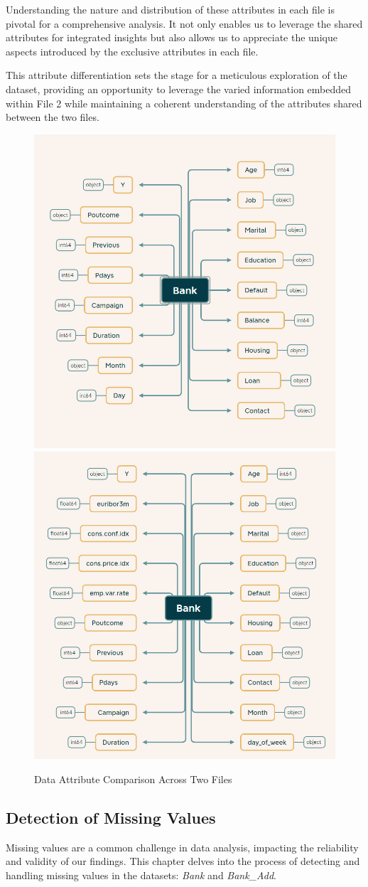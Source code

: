 \documentclass{article}
\begin{document}
Understanding the nature and distribution of these attributes in each file is pivotal for a comprehensive analysis. It not only enables us to leverage the shared attributes for integrated insights but also allows us to appreciate the unique aspects introduced by the exclusive attributes in each file.

This attribute differentiation sets the stage for a meticulous exploration of the dataset, providing an opportunity to leverage the varied information embedded within File 2 while maintaining a coherent understanding of the attributes shared between the two files.

\begin{figure}[h]
    \centering
    \includegraphics[width=0.4\linewidth]{data/bank_marketing/pic/Bank_attributes .png}\hfill
    \includegraphics[width=0.4\linewidth]{data/bank_marketing/pic/Bank_Add_attributes .png}
    \caption{Data Attribute Comparison Across Two Files}
    \label{fig:both}
  \end{figure}

  \subsection{Detection of Missing Values}
Missing values are a common challenge in data analysis, impacting the reliability and validity of our findings. This chapter delves into the process of detecting and handling missing values in the datasets: \textit{Bank} and \textit{Bank\_Add}.
\end{document}
